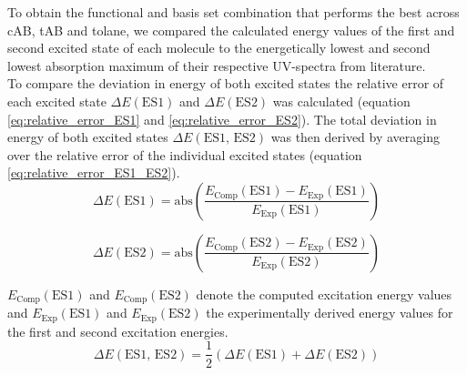 %
%
%
To obtain the functional and basis set combination that performs the best across cAB, tAB and tolane, we compared the calculated energy values of the first and second excited state of each molecule to the energetically lowest and second lowest absorption maximum of their respective UV-spectra from literature.\cite{UV-cis-trans-azo-1, UV-cis-trans-azo-2, UV-tolane-ref}\\
To compare the deviation in energy of both excited states the relative error of each excited state $\Delta E\left(\text{ES1}\right)$ and $\Delta E\left(\text{ES2}\right)$ was calculated (equation \ref{eq:relative_error_ES1} and \ref{eq:relative_error_ES2}). The total deviation in energy of both excited states $\Delta E\left(\text{ES1, ES2}\right)$ was then derived by averaging over the relative error of the individual excited states (equation \ref{eq:relative_error_ES1_ES2}).
%
\begin{equation}
\label{eq:relative_error_ES1}
    \Delta E\left(\text{ES1}\right) = \text{abs}\left(\frac{E_{\text{Comp}}(\text{ES1})-E_{\text{Exp}}(\text{ES1})}{E_{\text{Exp}}(\text{ES1})}\right)
\end{equation}

\begin{equation}
\label{eq:relative_error_ES2}
    \Delta E\left(\text{ES2}\right) = \text{abs}\left(\frac{E_{\text{Comp}}(\text{ES2})-E_{\text{Exp}}(\text{ES2})}{E_{\text{Exp}}(\text{ES2})}\right)
\end{equation}

$E_{\text{Comp}}(\text{ES1})$ and $E_{\text{Comp}}(\text{ES2})$ denote the computed excitation energy values and $E_{\text{Exp}}(\text{ES1})$ and $E_{\text{Exp}}(\text{ES2})$ the experimentally derived energy values for the first and second excitation energies.
\begin{equation}
\label{eq:relative_error_ES1_ES2}
    \Delta E\left(\text{ES1, ES2}\right) = \frac{1}{2} \left(\Delta E\left(\text{ES1}\right) + \Delta E\left(\text{ES2}\right)\right)
\end{equation}



